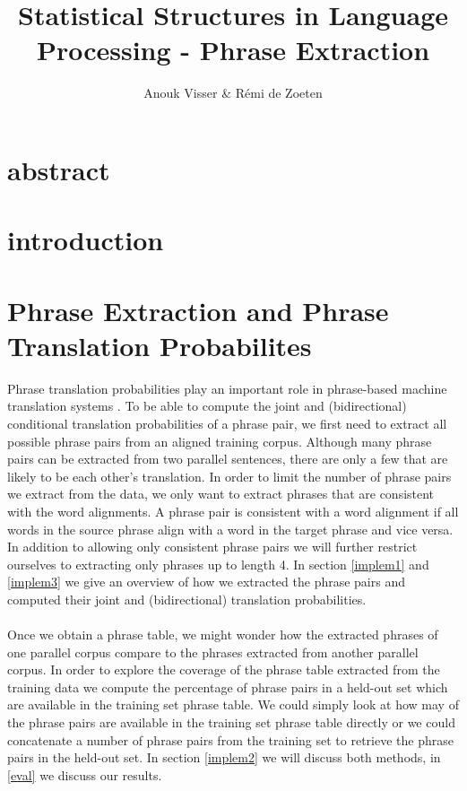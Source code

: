 \documentclass[11pt]{article}
\title{Statistical Structures in Language Processing - Phrase Extraction}
\author{Anouk Visser \& R\'emi de Zoeten}
\date{}                                           %
\begin{document}
\maketitle
\newpage
\tableofcontents
\newpage

\section{abstract}
\section{introduction}
\section{Phrase Extraction and Phrase Translation Probabilites}
Phrase translation probabilities play an important role in phrase-based machine translation systems \cite{koehn}. To be able to compute the joint and (bidirectional) conditional translation probabilities of a phrase pair, we first need to extract all possible phrase pairs from an aligned training corpus. Although many phrase pairs can be extracted from two parallel sentences, there are only a few that are likely to be each other's translation. In order to limit the number of phrase pairs we extract from the data, we only want to extract phrases that are consistent with the word alignments. A phrase pair is consistent with a word alignment if all words in the source phrase align with a word in the target phrase and vice versa.  In addition to allowing only consistent phrase pairs we will further restrict ourselves to extracting only phrases up to length 4. In section \ref{implem1} and \ref{implem3} we give an overview of how we extracted the phrase pairs and computed their joint and (bidirectional) translation probabilities.\\\\
Once we obtain a phrase table, we might wonder how the extracted phrases of one parallel corpus compare to the phrases extracted from another parallel corpus. In order to explore the coverage of the phrase table extracted from the training data we compute the percentage of phrase pairs in a held-out set which are available in the training set phrase table. We could simply look at how may of the phrase pairs are available in the training set phrase table directly or we could concatenate a number of phrase pairs from the training set to retrieve the phrase pairs in the held-out set. In section \ref{implem2} we will discuss both methods, in \ref{eval} we discuss our results.
\end{document}
